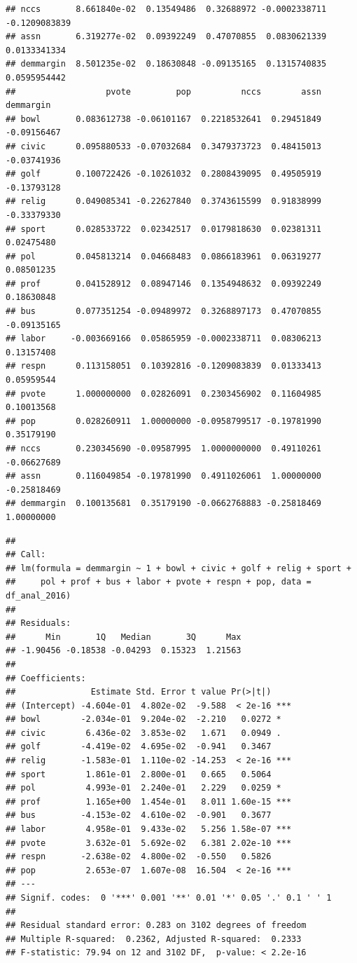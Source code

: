\documentclass[
  english,
  man]{apa6}
\begin{document}
\begin{verbatim}
## nccs       8.661840e-02  0.13549486  0.32688972 -0.0002338711 -0.1209083839
## assn       6.319277e-02  0.09392249  0.47070855  0.0830621339  0.0133341334
## demmargin  8.501235e-02  0.18630848 -0.09135165  0.1315740835  0.0595954442
##                  pvote         pop          nccs        assn   demmargin
## bowl       0.083612738 -0.06101167  0.2218532641  0.29451849 -0.09156467
## civic      0.095880533 -0.07032684  0.3479373723  0.48415013 -0.03741936
## golf       0.100722426 -0.10261032  0.2808439095  0.49505919 -0.13793128
## relig      0.049085341 -0.22627840  0.3743615599  0.91838999 -0.33379330
## sport      0.028533722  0.02342517  0.0179818630  0.02381311  0.02475480
## pol        0.045813214  0.04668483  0.0866183961  0.06319277  0.08501235
## prof       0.041528912  0.08947146  0.1354948632  0.09392249  0.18630848
## bus        0.077351254 -0.09489972  0.3268897173  0.47070855 -0.09135165
## labor     -0.003669166  0.05865959 -0.0002338711  0.08306213  0.13157408
## respn      0.113158051  0.10392816 -0.1209083839  0.01333413  0.05959544
## pvote      1.000000000  0.02826091  0.2303456902  0.11604985  0.10013568
## pop        0.028260911  1.00000000 -0.0958799517 -0.19781990  0.35179190
## nccs       0.230345690 -0.09587995  1.0000000000  0.49110261 -0.06627689
## assn       0.116049854 -0.19781990  0.4911026061  1.00000000 -0.25818469
## demmargin  0.100135681  0.35179190 -0.0662768883 -0.25818469  1.00000000
\end{verbatim}

\begin{verbatim}
## 
## Call:
## lm(formula = demmargin ~ 1 + bowl + civic + golf + relig + sport + 
##     pol + prof + bus + labor + pvote + respn + pop, data = df_anal_2016)
## 
## Residuals:
##      Min       1Q   Median       3Q      Max 
## -1.90456 -0.18538 -0.04293  0.15323  1.21563 
## 
## Coefficients:
##               Estimate Std. Error t value Pr(>|t|)    
## (Intercept) -4.604e-01  4.802e-02  -9.588  < 2e-16 ***
## bowl        -2.034e-01  9.204e-02  -2.210   0.0272 *  
## civic        6.436e-02  3.853e-02   1.671   0.0949 .  
## golf        -4.419e-02  4.695e-02  -0.941   0.3467    
## relig       -1.583e-01  1.110e-02 -14.253  < 2e-16 ***
## sport        1.861e-01  2.800e-01   0.665   0.5064    
## pol          4.993e-01  2.240e-01   2.229   0.0259 *  
## prof         1.165e+00  1.454e-01   8.011 1.60e-15 ***
## bus         -4.153e-02  4.610e-02  -0.901   0.3677    
## labor        4.958e-01  9.433e-02   5.256 1.58e-07 ***
## pvote        3.632e-01  5.692e-02   6.381 2.02e-10 ***
## respn       -2.638e-02  4.800e-02  -0.550   0.5826    
## pop          2.653e-07  1.607e-08  16.504  < 2e-16 ***
## ---
## Signif. codes:  0 '***' 0.001 '**' 0.01 '*' 0.05 '.' 0.1 ' ' 1
## 
## Residual standard error: 0.283 on 3102 degrees of freedom
## Multiple R-squared:  0.2362, Adjusted R-squared:  0.2333 
## F-statistic: 79.94 on 12 and 3102 DF,  p-value: < 2.2e-16
\end{verbatim}
\end{document}
